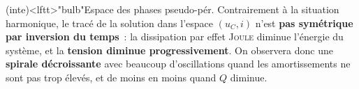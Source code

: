 \documentclass[../../main/main.tex]{subfiles}
\begin{document}
\begin{tcb}[breakable](inte)<lftt>"bulb"{Espace des phases pseudo-pér.}
	Contrairement à la situation harmonique, le tracé de la solution dans
	l'espace $(u_C,i)$ n'est \textbf{pas symétrique par inversion du temps}~: la
	dissipation par effet \textsc{Joule} diminue l'énergie du système, et la
	\textbf{tension diminue progressivement}.
	\bigbreak
	On observera donc une \textbf{spirale décroissante} avec beaucoup
	d'oscillations quand les amortissements ne sont pas trop élevés, et de moins
	en moins quand $Q$ diminue.
	\tcblower
	\noindent
	\begin{minipage}{0.49\linewidth}
		\begin{center}
		\end{center}
	\end{minipage}
	\begin{minipage}{0.49\linewidth}
		\begin{center}
\end{center}
\end{minipage}
\end{tcb}
\end{document}
